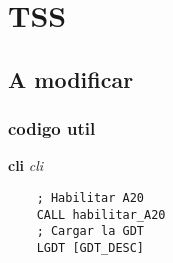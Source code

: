 
\section{TSS}
\subsection{A modificar}
\subsubsection{codigo util}
\textbf{cli} \textit{cli}

\begin{codesnippet}
\begin{verbatim}
    ; Habilitar A20
    CALL habilitar_A20
    ; Cargar la GDT
    LGDT [GDT_DESC]
\end{verbatim}
\end{codesnippet}
